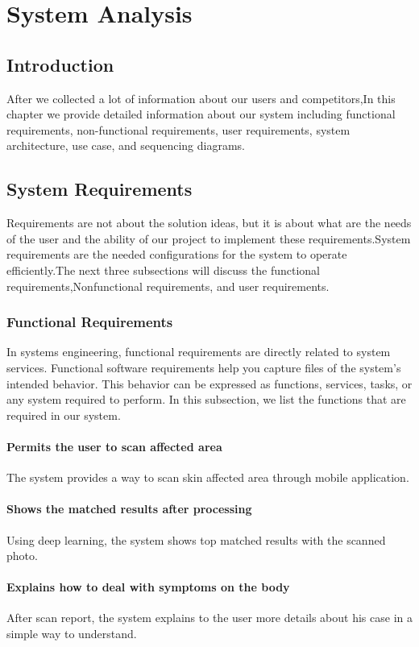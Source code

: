 \chapter{System Analysis}
\section{Introduction}
After we collected a lot of information about our users and competitors,In this chapter we provide detailed information about our system including functional requirements, non-functional requirements, user requirements, system architecture, use case, and sequencing diagrams.
\section{System Requirements}
Requirements are not about the solution ideas, but it is about what are the needs of the user and the ability of our project to implement these requirements.System requirements are the needed configurations for the system to operate efficiently.The next three subsections will discuss the functional requirements,Nonfunctional requirements, and user requirements.
\subsection{Functional Requirements }
In systems engineering, functional requirements are directly related to system services. Functional software requirements help you capture files of the system's intended behavior. This behavior can be expressed as functions, services, tasks, or any system required to perform. In this subsection, we list the functions that are required in our system.
\subsubsection{Permits the user to scan affected area}
The system provides a way to scan skin affected area through mobile application.
\subsubsection{Shows the matched results after processing}
Using deep learning, the system shows top matched results with the scanned photo.  
\subsubsection{Explains how to deal with symptoms on the body}
After scan report, the system explains to the user more details about his case in a simple way to understand.
